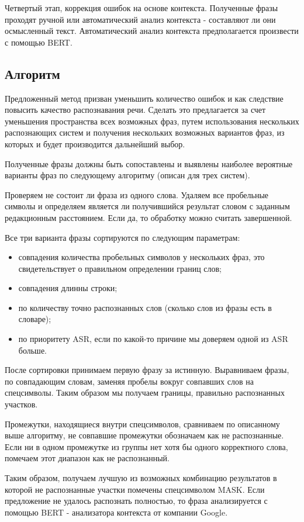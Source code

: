 \documentclass[conference]{IEEEtran}
\begin{document}
Четвертый этап, коррекция ошибок на основе контекста. Полученные фразы проходят ручной или автоматический анализ контекста - составляют ли они осмысленный текст. Автоматический анализ контекста предполагается произвести с помощью BERT.

\subsection{Алгоритм}
Предложенный метод призван уменьшить количество ошибок и как следствие повысить качество распознавания речи. Сделать это предлагается за счет уменьшения пространства всех возможных фраз, путем использования нескольких распознающих систем и получения нескольких возможных вариантов фраз, из которых и будет производится дальнейший выбор.

Полученные фразы должны быть сопоставлены и выявлены наиболее вероятные варианты фраз по следующему алгоритму (описан для трех систем).

Проверяем не состоит ли фраза из одного слова. Удаляем все пробельные символы и определяем является ли получившийся результат словом с заданным редакционным расстоянием. Если да, то обработку можно считать завершенной.

Все три варианта фразы сортируются по следующим параметрам:

\begin{itemize}
\item совпадения количества пробельных символов у нескольких фраз, это свидетельствует о правильном определении границ слов;
\item совпадения длинны строки;
\item по количеству точно распознанных слов (сколько слов из фразы есть в словаре);
\item по приоритету ASR, если по какой-то причине мы доверяем одной из ASR больше.
\end{itemize}

После сортировки принимаем первую фразу за истинную. Выравниваем фразы, по совпадающим словам, заменяя пробелы вокруг совпавших слов на спецсимволы. Таким образом мы получаем границы, правильно распознанных участков.

Промежутки, находящиеся внутри спецсимволов, сравниваем по описанному выше алгоритму, не совпавшие промежутки обозначаем как не распознанные. Если ни в одном промежутке из группы нет хотя бы одного корректного слова, помечаем этот диапазон как не распознанный.

Таким образом, получаем лучшую из возможных комбинацию результатов в которой не распознанные участки помечены спецсимволом MASK. Если предложение не удалось распознать полностью, то фраза анализируется с помощью BERT - анализатора контекста от компании Google.
\end{document}
